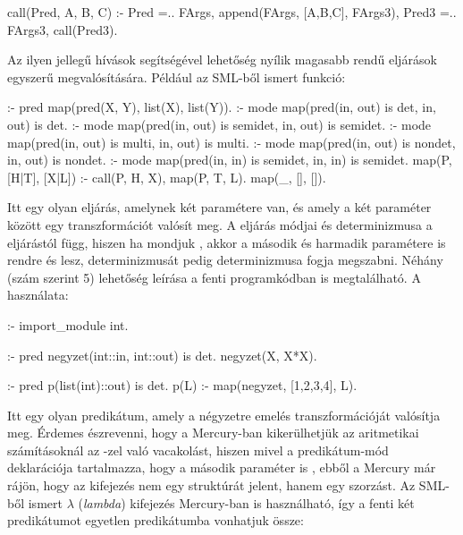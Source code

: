 \begin{prologcode}
call(Pred, A, B, C) :- 
    Pred =.. FArgs, 
    append(FArgs, [A,B,C], FArgs3), 
    Pred3 =.. FArgs3,
    call(Pred3).
\end{prologcode}

Az ilyen jellegű  hívások segítségével lehetőség nyílik magasabb rendű
eljárások egyszerű megvalósítására. Például az SML-ből ismert  funkció:

\begin{prologcode}
:- pred map(pred(X, Y), list(X), list(Y)).
:- mode map(pred(in, out) is det, in, out) is det.
:- mode map(pred(in, out) is semidet, in, out) is semidet.
:- mode map(pred(in, out) is multi, in, out) is multi.
:- mode map(pred(in, out) is nondet, in, out) is nondet.
:- mode map(pred(in, in) is semidet, in, in) is semidet.
map(P, [H|T], [X|L]) :-
         call(P, H, X),
         map(P, T, L).
map(_, [], []).
\end{prologcode}

Itt  egy olyan eljárás, amelynek két paramétere van, és amely a két
paraméter között egy transzformációt valósít meg. A  eljárás módjai
és determinizmusa a  eljárástól függ, hiszen ha  mondjuk
, akkor a  második és harmadik paramétere
is rendre  és  lesz,  determinizmusát pedig 
determinizmusa fogja megszabni. Néhány (szám szerint 5) lehetőség leírása a
fenti programkódban is megtalálható. A  használata:

\begin{prologcode}
:- import_module int.

:- pred negyzet(int::in, int::out) is det.
negyzet(X, X*X).

:- pred p(list(int)::out) is det.
p(L) :-
         map(negyzet, [1,2,3,4], L).
\end{prologcode}

Itt  egy olyan predikátum, amely a négyzetre emelés transzformációját
valósítja meg. Érdemes észrevenni, hogy a Mercury-ban kikerülhetjük az aritmetikai
számításoknál az -zel való vacakolást, hiszen mivel a 
predikátum-mód deklarációja tartalmazza, hogy a második paraméter is ,
ebből a Mercury már rájön, hogy az  kifejezés nem egy  struktúrát
jelent, hanem egy szorzást.
\br
Az SML-ből ismert $\lambda$ (\emph{lambda}) kifejezés Mercury-ban is használható,
így a fenti két predikátumot egyetlen predikátumba vonhatjuk össze:

